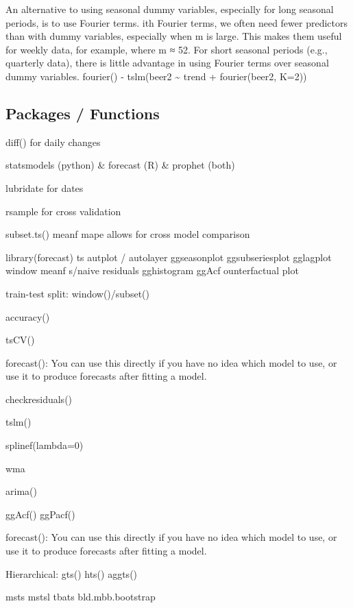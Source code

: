 \documentclass[]{book}
\begin{document}
An alternative to using seasonal dummy variables, especially for long seasonal periods, is to use Fourier terms. ith Fourier terms, we often need fewer predictors than with dummy variables, especially when m is large. This makes them useful for weekly data, for example, where m ≈ 52. For short seasonal periods (e.g., quarterly data), there is little advantage in using Fourier terms over seasonal dummy variables. fourier() - tslm(beer2 \textasciitilde{} trend + fourier(beer2, K=2))

\hypertarget{packages-functions}{%
\subsection{Packages / Functions}\label{packages-functions}}

diff() for daily changes

statsmodels (python) \& forecast (R) \& prophet (both)

lubridate for dates

rsample for cross validation

subset.ts() \textbar{} meanf \textbar{} mape allows for cross model comparison

library(forecast) \textbar{} ts \textbar{} autplot / autolayer \textbar{} ggseasonplot \textbar{} ggsubseriesplot \textbar{} gglagplot \textbar{} window \textbar{} meanf \textbar{} s/naive \textbar{} residuals \textbar{} gghistogram \textbar{} ggAcf \textbar{} ounterfactual plot

train-test split: window()/subset()

accuracy()

tsCV()

forecast(): You can use this directly if you have no idea which model to use, or use it to produce forecasts after fitting a model.

checkresiduals()

tslm()

splinef(lambda=0)

wma

arima()

ggAcf() \textbar{} ggPacf()

forecast(): You can use this directly if you have no idea which model to use, or use it to produce forecasts after fitting a model.

Hierarchical: gts() \textbar{} hts() \textbar{} aggts()

msts \textbar{} mstsl \textbar{} tbats \textbar{} bld.mbb.bootstrap
\end{document}
